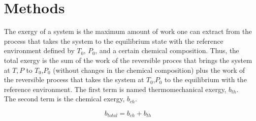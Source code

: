 \documentclass[energies,article,submit,pdftex,moreauthors]{Definitions/mdpi}
\begin{document}
%
%
%

\section{Methods}



The exergy of a system is the maximum amount of work one can extract
from the process that takes the system
to the equilibrium state with the reference environment
defined by $T_{0}$, $P_{0}$, and a certain chemical composition.
Thus, the total exergy is the sum of the work
of the reversible proces that brings the system at $T, P$ to $T_{0}$,$P_{0}$
(without changes in the chemical composition)
plus the work of the reversible process that takes the system at $T_{0}$,$P_{0}$
to the equilibrium with the reference environment.
The first term is named thermomechanical exergy, $b_{th}$.
The second term is the chemical exergy, $b_{ch}$.

\begin{equation}\label{eq:general_material_exergy_definition}
  b_{total} = b_{ch} + b_{th}
\end{equation}
\end{document}
